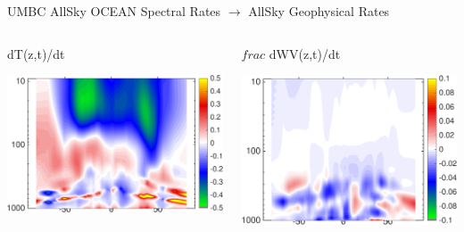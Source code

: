 \documentclass[10pt,t]{beamer}
\begin{document}
\begin{frame}{UMBC AllSky OCEAN Spectral Rates $\rightarrow$ AllSky Geophysical Rates}
\vspace{-0.35in}

\begin{columns}
\begin{column}{0.45\columnwidth}
\begin{block}{\footnotesize dT(z,t)/dt}
\vspace{-0.1in}
\begin{center}
\includegraphics[width=\linewidth]{Figs/CloudAnom/Desc/tz_lat_p_rates_from_obs_specral_rates.png}
\end{center}
\end{block}
\end{column}

\begin{column}{0.45\columnwidth}
\begin{block}{\footnotesize $frac$ dWV(z,t)/dt}
\vspace{-0.1in}
\begin{center}
\includegraphics[width=\linewidth]{Figs/CloudAnom/Desc/wv_lat_p_rates_from_obs_specral_rates.png}
\end{center}
\end{block}
\end{column}
\end{columns}


\end{frame}
\end{document}
